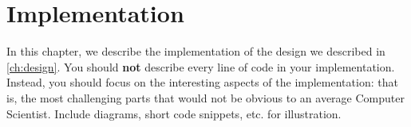 \chapter{Implementation}
\label{ch:implementation}

In this chapter, we describe the implementation of the design we described in \ref{ch:design}. You should \textbf{not} describe every line of code in your implementation. Instead, you should focus on the interesting aspects of the implementation: that is, the most challenging parts that would not be obvious to an average Computer Scientist. Include diagrams, short code snippets, etc. for illustration. 
